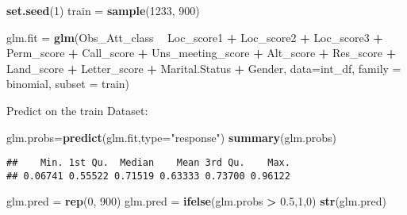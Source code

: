 \documentclass[]{article}
\newenvironment{Shaded}{\begin{snugshade}}{\end{snugshade}}
\newcommand{\KeywordTok}[1]{\textcolor[rgb]{0.13,0.29,0.53}{\textbf{#1}}}
\newcommand{\DataTypeTok}[1]{\textcolor[rgb]{0.13,0.29,0.53}{#1}}
\newcommand{\DecValTok}[1]{\textcolor[rgb]{0.00,0.00,0.81}{#1}}
\newcommand{\FloatTok}[1]{\textcolor[rgb]{0.00,0.00,0.81}{#1}}
\newcommand{\StringTok}[1]{\textcolor[rgb]{0.31,0.60,0.02}{#1}}
\newcommand{\OperatorTok}[1]{\textcolor[rgb]{0.81,0.36,0.00}{\textbf{#1}}}
\newcommand{\NormalTok}[1]{#1}
\begin{document}
\begin{Shaded}
\begin{Highlighting}[]
\KeywordTok{set.seed}\NormalTok{(}\DecValTok{1}\NormalTok{)}
\NormalTok{train =}\StringTok{ }\KeywordTok{sample}\NormalTok{(}\DecValTok{1233}\NormalTok{, }\DecValTok{900}\NormalTok{)}

\NormalTok{glm.fit =}\StringTok{ }\KeywordTok{glm}\NormalTok{(Obs_Att_class }\OperatorTok{~}\StringTok{ }\NormalTok{Loc_score1 }\OperatorTok{+}\StringTok{ }\NormalTok{Loc_score2 }\OperatorTok{+}\StringTok{ }\NormalTok{Loc_score3 }\OperatorTok{+}
\StringTok{                }\NormalTok{Perm_score }\OperatorTok{+}\StringTok{ }\NormalTok{Call_score }\OperatorTok{+}\StringTok{ }\NormalTok{Uns_meeting_score }\OperatorTok{+}\StringTok{ }\NormalTok{Alt_score }\OperatorTok{+}\StringTok{ }
\StringTok{                }\NormalTok{Res_score }\OperatorTok{+}\StringTok{ }\NormalTok{Land_score }\OperatorTok{+}\StringTok{ }\NormalTok{Letter_score }\OperatorTok{+}\StringTok{ }\NormalTok{Marital.Status }\OperatorTok{+}\StringTok{ }\NormalTok{Gender,}
              \DataTypeTok{data=}\NormalTok{int_df, }\DataTypeTok{family =}\NormalTok{ binomial, }\DataTypeTok{subset =}\NormalTok{ train)}
\end{Highlighting}
\end{Shaded}

Predict on the train Dataset:

\begin{Shaded}
\begin{Highlighting}[]
\NormalTok{glm.probs=}\KeywordTok{predict}\NormalTok{(glm.fit,}\DataTypeTok{type=}\StringTok{"response"}\NormalTok{)}
\KeywordTok{summary}\NormalTok{(glm.probs)}
\end{Highlighting}
\end{Shaded}

\begin{verbatim}
##    Min. 1st Qu.  Median    Mean 3rd Qu.    Max. 
## 0.06741 0.55522 0.71519 0.63333 0.73700 0.96122
\end{verbatim}

\begin{Shaded}
\begin{Highlighting}[]
\NormalTok{glm.pred =}\StringTok{ }\KeywordTok{rep}\NormalTok{(}\DecValTok{0}\NormalTok{, }\DecValTok{900}\NormalTok{)}
\NormalTok{glm.pred =}\StringTok{ }\KeywordTok{ifelse}\NormalTok{(glm.probs }\OperatorTok{>}\StringTok{ }\FloatTok{0.5}\NormalTok{,}\DecValTok{1}\NormalTok{,}\DecValTok{0}\NormalTok{)}
\KeywordTok{str}\NormalTok{(glm.pred)}
\end{Highlighting}
\end{Shaded}
\end{document}
